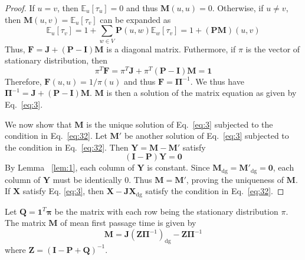 \begin{proof}
  If $u = v$, then $\mathbb{E}_{u}[\tau_u] = 0$ and thus
  $\mathbf{M}(u,u) = 0$. Otherwise, if $u \not = v$, then
  $\mathbf{M}(u,v) = \mathbb{E}_{u}[\tau_v]$ can be expanded as
  \begin{equation}
    \label{eq:4}
    \mathbb{E}_{u}[\tau_v] = 1 + \sum_{w \in V}{\mathbf{P}(u,w)
      \mathbb{E}_{w}[\tau_v]} = 1 + (\mathbf{PM})(u,v)
  \end{equation}
  Thus, $\mathbf{F} = \mathbf{J} + (\mathbf{P} -
  \mathbf{I})\mathbf{M}$ is a diagonal matrix. Futhermore, if $\pi$ is
  the vector of stationary distribution, then
  \begin{equation}
    \label{eq:26}
    \pi^{T} \mathbf{F} = \pi^{T} \mathbf{J} + \pi^{T} (\mathbf{P} -
    \mathbf{I})\mathbf{M} = \mathbf{1}   
  \end{equation}
  Therefore, $\mathbf{F}(u,u) = 1/\pi(u)$ and thus $\mathbf{F} =
  \bm{\Pi}^{-1}$. We thus have $\bm{\Pi}^{-1} = \mathbf{J} +
  (\mathbf{P} - \mathbf{I})\mathbf{M}$. $\mathbf{M}$ is then a 
  solution of the matrix equation as given by Eq.~\eqref{eq:3}.

  We now show that $\mathbf{M}$ is the unique solution of
  Eq.~\eqref{eq:3} subjected to the condition in
  Eq.~\eqref{eq:32}. Let $\mathbf{M}'$ be another solution of
  Eq.~\eqref{eq:3} subjected to the condition in
  Eq.~\eqref{eq:32}. Then $\mathbf{Y} = \mathbf{M} - \mathbf{M}'$
  satisfy
  \begin{equation}
    \label{eq:19}
    (\mathbf{I} - \mathbf{P})\mathbf{Y} = \mathbf{0}
  \end{equation}
  By Lemma ~\ref{lem:1}, each column of $\mathbf{Y}$ is constant. Since
  $\mathbf{M}_{\mathrm{dg}} = \mathbf{M'}_{\mathrm{dg}} = \mathbf{0}$, each
  column of $\mathbf{Y}$ must be identically $0$. Thus $\mathbf{M} = \mathbf{M'}$,
  proving the uniqueness of $\mathbf{M}$. If $\mathbf{X}$ satisfy
  Eq. \eqref{eq:3}, then $\mathbf{X} - \mathbf{J}\mathbf{X}_{\mathrm{dg}}$
  satisfy the condition in Eq.~\eqref{eq:32}.
\end{proof}
%
\begin{proposition}
  \label{prop:5}
  Let $\mathbf{Q} = \mathbf{1}^{T}\mathbf{\pi}$ be the matrix with
  each row being the stationary distribution $\pi$. The matrix
  $\mathbf{M}$ of mean first passage time is given by
  \begin{equation}
    \label{eq:21}
    \mathbf{M} = \mathbf{J}(\mathbf{Z} \bm{\Pi}^{-1})_{\mathrm{dg}} - \mathbf{Z}
    \bm{\Pi}^{-1}
  \end{equation}
  where $\mathbf{Z} = (\mathbf{I} - \mathbf{P} + \mathbf{Q})^{-1}$. 
\end{proposition}
